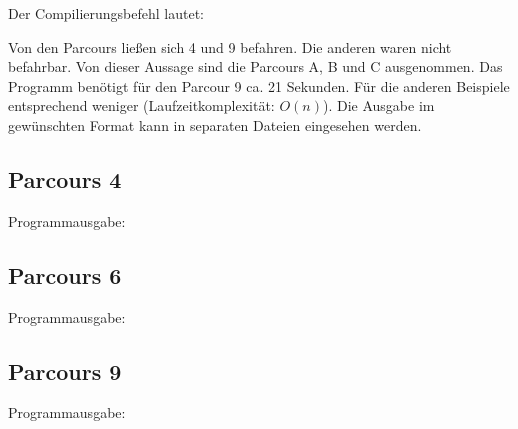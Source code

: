 Der Compilierungsbefehl lautet:


Von den Parcours ließen sich 4 und 9 befahren. Die anderen waren nicht befahrbar. Von dieser Aussage sind die Parcours A, B und C ausgenommen.
Das Programm benötigt für den Parcour 9 ca. 21 Sekunden. Für die anderen Beispiele entsprechend weniger (Laufzeitkomplexität: \(O(n)\)).
Die Ausgabe im gewünschten Format kann in separaten Dateien eingesehen werden.
\subsection{Parcours 4}
	Programmausgabe:\\
\subsection{Parcours 6}
	Programmausgabe:\\
\subsection{Parcours 9}
	Programmausgabe:\\

